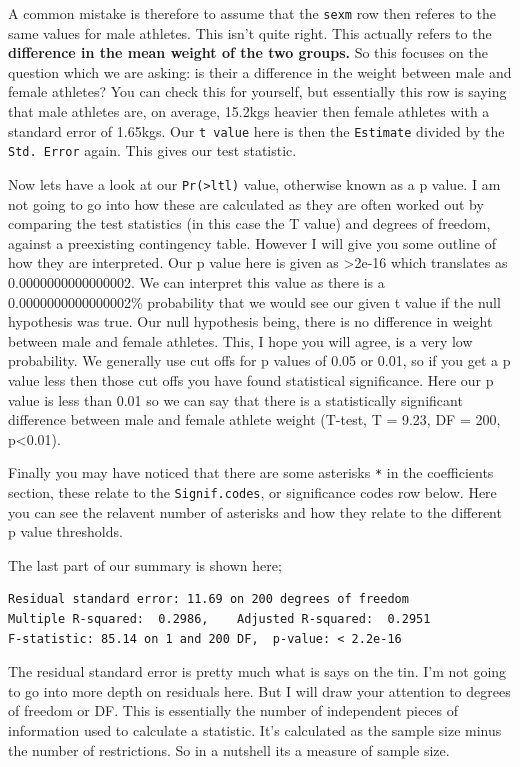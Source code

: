 \documentclass[
]{book}
\begin{document}
A common mistake is therefore to assume that the \texttt{sexm} row then referes to the same values for male athletes. This isn't quite right. This actually refers to the \textbf{difference in the mean weight of the two groups.} So this focuses on the question which we are asking: is their a difference in the weight between male and female athletes? You can check this for yourself, but essentially this row is saying that male athletes are, on average, 15.2kgs heavier then female athletes with a standard error of 1.65kgs. Our \texttt{t\ value} here is then the \texttt{Estimate} divided by the \texttt{Std.\ Error} again. This gives our test statistic.

Now lets have a look at our \texttt{Pr(\textgreater{}ltl)} value, otherwise known as a p value. I am not going to go into how these are calculated as they are often worked out by comparing the test statistics (in this case the T value) and degrees of freedom, against a preexisting contingency table. However I will give you some outline of how they are interpreted. Our p value here is given as \textgreater2e-16 which translates as 0.0000000000000002. We can interpret this value as there is a 0.0000000000000002\% probability that we would see our given t value if the null hypothesis was true. Our null hypothesis being, there is no difference in weight between male and female athletes. This, I hope you will agree, is a very low probability. We generally use cut offs for p values of 0.05 or 0.01, so if you get a p value less then those cut offs you have found statistical significance. Here our p value is less than 0.01 so we can say that there is a statistically significant difference between male and female athlete weight (T-test, T = 9.23, DF = 200, p\textless0.01).

Finally you may have noticed that there are some asterisks \texttt{*} in the coefficients section, these relate to the \texttt{Signif.codes}, or significance codes row below. Here you can see the relavent number of asterisks and how they relate to the different p value thresholds.

The last part of our summary is shown here;

\begin{verbatim}
Residual standard error: 11.69 on 200 degrees of freedom
Multiple R-squared:  0.2986,    Adjusted R-squared:  0.2951 
F-statistic: 85.14 on 1 and 200 DF,  p-value: < 2.2e-16
\end{verbatim}

The residual standard error is pretty much what is says on the tin. I'm not going to go into more depth on residuals here. But I will draw your attention to degrees of freedom or DF. This is essentially the number of independent pieces of information used to calculate a statistic. It's calculated as the sample size minus the number of restrictions. So in a nutshell its a measure of sample size.
\end{document}
